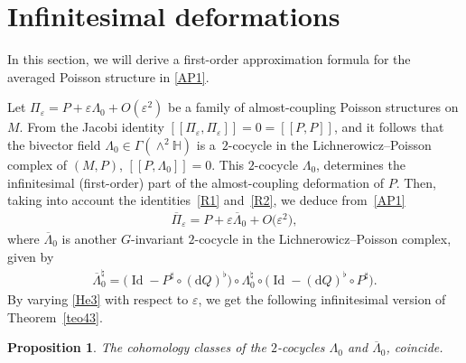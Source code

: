 \documentclass[10pt,a4paper]{amsart}
\numberwithin{equation}{section}
\newtheorem{Proposition}[Theorem]{Proposition}
 { \theoremstyle{definition}
\newtheorem{Definition}[Theorem]{Definition}
\newtheorem{Example}[Theorem]{Example}
\newtheorem{Remark}[Theorem]{Remark} }
\begin{document}
\section{Inf\/initesimal deformations}

In this section, we will derive a f\/irst-order approximation formula for the averaged Poisson structure in \eqref{AP1}.

Let $\Pi_{\varepsilon}=P+\varepsilon\Lambda_{0}+O(\varepsilon ^{2})$ be a family of almost-coupling Poisson structures on $M$. From the Jacobi identity $[\![\Pi_{\varepsilon},\Pi_{\varepsilon}]\!]=0=[\![P,P]\!]$, and it follows that the bivector f\/ield $\Lambda_{0}\in\Gamma(\wedge^{2}\mathbb{H})$ is a~$2$-cocycle in the Lichnerowicz--Poisson complex of $(M,P)$, $[\![P,\Lambda_{0}]\!]=0$. This $2$-cocycle $\Lambda_{0}$, determines the inf\/initesimal (f\/irst-order) part of the almost-coupling deformation of $P$. Then, taking into account the identities~\eqref{R1} and~\eqref{R2}, we deduce from~\eqref{AP1}
\begin{gather}\label{He3}
\overline{\Pi}_{\varepsilon}=P+\varepsilon\overline{\Lambda}_{0}+O\big(\varepsilon^{2}\big),
\end{gather}
where $\overline{\Lambda}_{0}$ is another $G$-invariant $2$-cocycle in the Lichnerowicz--Poisson complex, given by
\begin{gather*}
\overline{\Lambda}_{0}^{\natural}=\big( \operatorname{Id}-P^{\sharp}\circ(\mathrm{d}Q)^{\flat}\big) \circ\Lambda_{0}^{\natural}\circ\big(
\operatorname{Id}-(\mathrm{d}Q)^{\flat}\circ P^{\sharp}\big).
\end{gather*}
By varying \eqref{He3} with respect to $\varepsilon$, we get the following inf\/initesimal version of Theorem~\ref{teo43}.

\begin{Proposition}
The cohomology classes of the $2$-cocycles $\Lambda_{0}$ and $\overline{\Lambda}_{0}$, coincide.
\end{Proposition}
\end{document}
